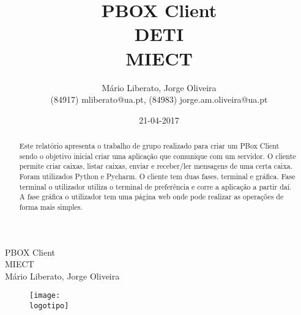 \documentclass{report}
\begin{document}
%
%
\def\titulo{PBOX Client}
\def\data{21-04-2017}
\def\autores{Mário Liberato, Jorge Oliveira}
\def\autorescontactos{(84917) mliberato@ua.pt, (84983) jorge.am.oliveira@ua.pt}
\def\departamento{DETI}
\def\curso{MIECT}
\def\logotipo{ua.pdf}
%
%
\begin{titlepage}

\begin{center}
%
\vspace*{50mm}
%
{\Huge \titulo}\\ 
%
\vspace{10mm}
%
{\Large \curso}\\
%
\vspace{10mm}
%
{\LARGE \autores}\\ 
%
\vspace{30mm}
%
\begin{figure}[h]
\center
\texttt{[image: \\logotipo]}
\end{figure}
%
\vspace{30mm}
\end{center}
%
\end{titlepage}

\title{%
{\Huge\textbf{\titulo}}\\
{\Large \departamento\\ \curso}
}
%
\author{%
    \autores \\
    \autorescontactos
}
%
\date{\data}
%
\maketitle


\begin{abstract}
Este relatório apresenta o trabalho de grupo realizado para criar um PBox Client sendo o objetivo inicial criar uma aplicação que comunique com um servidor. O cliente permite criar caixas, listar caixas, enviar e receber/ler mensagens de uma certa caixa. Foram utilizados Python e Pycharm. O cliente tem duas fases, terminal e gráfica. Fase terminal o utilizador utiliza o terminal de preferência e corre a aplicação a partir daí. A fase gráfica o utilizador tem uma página web onde pode realizar as operações de forma mais simples.
\end{abstract}

\end{document}
